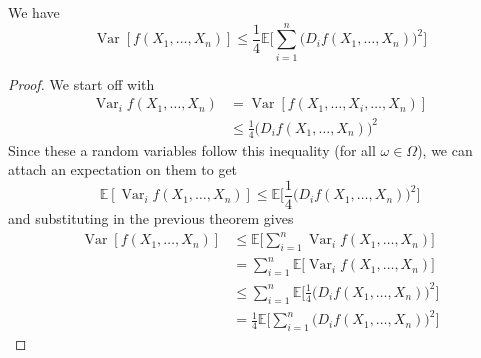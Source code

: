 \documentclass{article}
\DeclareMathOperator{\Var}{Var}
\begin{document}
\begin{corollary}
We have 
\[\Var[ f(X_1, \ldots, X_n)] \leq \frac{1}{4} \mathbb{E} \bigg[ \sum_{i=1}^n \big( D_i f(X_1, \ldots, X_n) \big)^2 \bigg] \]
\end{corollary}
\begin{proof}
We start off with 
\begin{align*}
    \Var_i f (X_1, \ldots, X_n) & = \Var[ f(X_1, \ldots, X_i, \ldots, X_n)] \\
    & \leq \frac{1}{4} \big( D_i f (X_1, \ldots, X_n)\big)^2 
\end{align*}
Since these a random variables follow this inequality (for all $\omega \in \Omega$), we can attach an expectation on them to get 
\[\mathbb{E}[\Var_i f (X_1, \ldots, X_n)] \leq \mathbb{E} \bigg[ \frac{1}{4} \big( D_i f (X_1, \ldots, X_n)\big)^2\bigg] \]
and substituting in the previous theorem gives 
\begin{align*}
    \Var[f(X_1, \ldots, X_n)] & \leq \mathbb{E} \bigg[ \sum_{i=1}^n \Var_i f(X_1, \ldots, X_n) \bigg] \\
    & = \sum_{i=1}^n \mathbb{E}\big[ \Var_i f(X_1, \ldots, X_n) \big] \\
    & \leq \sum_{i=1}^n \mathbb{E} \bigg[ \frac{1}{4} \big( D_i f (X_1, \ldots, X_n)\big)^2\bigg] \\
    & = \frac{1}{4} \mathbb{E} \bigg[ \sum_{i=1}^n \big( D_i f(X_1, \ldots, X_n) \big)^2 \bigg] 
\end{align*}
\end{proof}

\begin{example}

\end{example}
\end{document}
